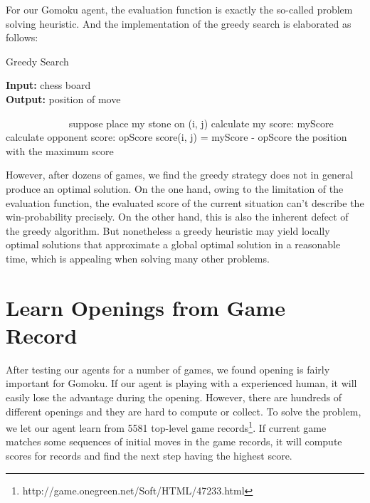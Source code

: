 \documentclass[12pt,a4paper]{article}
\begin{document}
For our Gomoku agent, the evaluation function is exactly the so-called problem solving heuristic.
And the implementation of the greedy search is elaborated as follows:
\begin{algorithm}[h]
\caption{Greedy Search}
\hspace*{0.02in} {\bf Input:} 
chess board\\
\hspace*{0.02in} {\bf Output:} 
position of move
\begin{algorithmic}
　　　　\State suppose place my stone on (i, j)
		\State calculate my score: myScore
        		\State calculate opponent score: opScore
        		\State score(i, j) = myScore - opScore
	\EndIf
\EndFor
\Return the position with the maximum score
\end{algorithmic}
\end{algorithm}

%
%

However, after dozens of games, we find the greedy strategy does not in general produce an optimal solution. On the one hand, owing to the limitation of the evaluation function, the evaluated score of the current situation can't describe the win-probability precisely. On the other hand, this is also the inherent defect of the greedy algorithm. But nonetheless a greedy heuristic may yield locally optimal solutions that approximate a global optimal solution in a reasonable time, which is appealing when solving many other problems.


\section{Learn Openings from Game Record}
After testing our agents for a number of games, we found opening is fairly important for Gomoku. If our agent is playing with a experienced human, it will easily lose the advantage during the opening. However, there are hundreds of different openings and they are hard to compute or collect. To solve the problem, we let our agent learn from 5581 top-level game records\footnote{http://game.onegreen.net/Soft/HTML/47233.html}. If current game matches some sequences of initial moves in the game records, it will compute scores for records and find the next step having the highest score.
\end{document}
